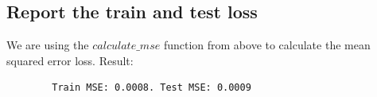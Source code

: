     \subsection{Report the train and test loss}
    We are using the $calculate\_mse$ function from above to calculate the mean squared error loss. Result:
    \begin{lstlisting}
        Train MSE: 0.0008. Test MSE: 0.0009
    \end{lstlisting}
    




